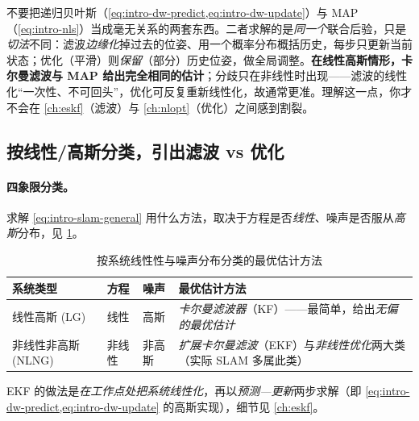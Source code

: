 \begin{pitfall}
不要把递归贝叶斯（\cref{eq:intro-dw-predict,eq:intro-dw-update}）与 MAP（\cref{eq:intro-nls}）当成毫无关系的两套东西。二者求解的是\emph{同一个}联合后验，只是\emph{切法}不同：滤波\emph{边缘化}掉过去的位姿、用一个概率分布概括历史，每步只更新当前状态；优化（平滑）则\emph{保留}（部分）历史位姿，做全局调整。\textbf{在线性高斯情形，卡尔曼滤波与 MAP 给出完全相同的估计}\cite{cadena2016past}；分歧只在非线性时出现——滤波的线性化“一次性、不可回头”，优化可反复重新线性化，故通常更准。理解这一点，你才不会在 \cref{ch:eskf}（滤波）与 \cref{ch:nlopt}（优化）之间感到割裂。
\end{pitfall}

\subsection{按线性/高斯分类，引出滤波 vs 优化}
\label{sec:intro-est}
\paragraph{四象限分类。}
求解 \cref{eq:intro-slam-general} 用什么方法，取决于方程是否\emph{线性}、噪声是否服从\emph{高斯}分布\cite{gaoxiang2019slam14}，见 \cref{tab:intro-lgnlng}。

\begin{table}[H]\centering\small
\caption{按系统线性性与噪声分布分类的最优估计方法}
\label{tab:intro-lgnlng}
\begin{tabular}{p{} p{} p{} p{}}
\toprule
系统类型 & 方程 & 噪声 & 最优估计方法 \\
\midrule
线性高斯 (LG) & 线性 & 高斯 & \emph{卡尔曼滤波器}（KF）——最简单，给出\emph{无偏的最优估计} \\
非线性非高斯 (NLNG) & 非线性 & 非高斯 & \emph{扩展卡尔曼滤波}（EKF）与\emph{非线性优化}两大类（实际 SLAM 多属此类） \\
\bottomrule
\end{tabular}
\end{table}

\noindent EKF 的做法是\emph{在工作点处把系统线性化}，再以\emph{预测—更新}两步求解（即 \cref{eq:intro-dw-predict,eq:intro-dw-update} 的高斯实现），细节见 \cref{ch:eskf}。

